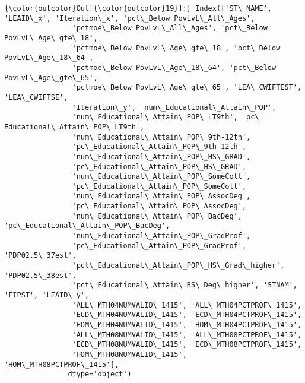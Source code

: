 \documentclass[11pt]{article}
\begin{document}
\begin{Verbatim}[commandchars=\\\{\}]
{\color{outcolor}Out[{\color{outcolor}19}]:} Index(['ST\_NAME', 'LEAID\_x', 'Iteration\_x', 'pct\_Below PovLvL\_All\_Ages',
                'pctmoe\_Below PovLvL\_All\_Ages', 'pct\_Below PovLvL\_Age\_gte\_18',
                'pctmoe\_Below PovLvL\_Age\_gte\_18', 'pct\_Below PovLvL\_Age\_18\_64',
                'pctmoe\_Below PovLvL\_Age\_18\_64', 'pct\_Below PovLvL\_Age\_gte\_65',
                'pctmoe\_Below PovLvL\_Age\_gte\_65', 'LEA\_CWIFTEST', 'LEA\_CWIFTSE',
                'Iteration\_y', 'num\_Educational\_Attain\_POP',
                'num\_Educational\_Attain\_POP\_LT9th', 'pc\_ Educational\_Attain\_POP\_LT9th',
                'num\_Educational\_Attain\_POP\_9th-12th',
                'pc\_Educational\_Attain\_POP\_9th-12th',
                'num\_Educational\_Attain\_POP\_HS\_GRAD',
                'pc\_Educational\_Attain\_POP\_HS\_GRAD',
                'num\_Educational\_Attain\_POP\_SomeColl',
                'pc\_Educational\_Attain\_POP\_SomeColl',
                'num\_Educational\_Attain\_POP\_AssocDeg',
                'pc\_Educational\_Attain\_POP\_AssocDeg',
                'num\_Educational\_Attain\_POP\_BacDeg', 'pc\_Educational\_Attain\_POP\_BacDeg',
                'num\_Educational\_Attain\_POP\_GradProf',
                'pc\_Educational\_Attain\_POP\_GradProf', 'PDP02.5\_37est',
                'pct\_Educational\_Attain\_POP\_HS\_Grad\_higher', 'PDP02.5\_38est',
                'pct\_Educational\_Attain\_BS\_Deg\_higher', 'STNAM', 'FIPST', 'LEAID\_y',
                'ALL\_MTH04NUMVALID\_1415', 'ALL\_MTH04PCTPROF\_1415',
                'ECD\_MTH04NUMVALID\_1415', 'ECD\_MTH04PCTPROF\_1415',
                'HOM\_MTH04NUMVALID\_1415', 'HOM\_MTH04PCTPROF\_1415',
                'ALL\_MTH08NUMVALID\_1415', 'ALL\_MTH08PCTPROF\_1415',
                'ECD\_MTH08NUMVALID\_1415', 'ECD\_MTH08PCTPROF\_1415',
                'HOM\_MTH08NUMVALID\_1415', 'HOM\_MTH08PCTPROF\_1415'],
               dtype='object')
\end{Verbatim}
            
\end{document}
